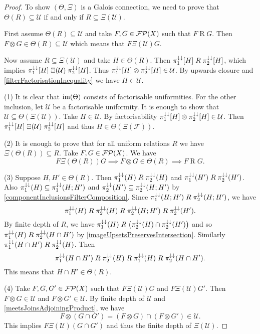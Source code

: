 \begin{proof}
To show $(\Theta,\Xi)$ is a Galois connection, we need to prove that $\Theta(R) \subseteq \mathcal{U}$ \textup{if and only if} $R \subseteq \Xi(\mathcal{U})$.

First assume $\Theta(R) \subseteq \mathcal{U}$ and take $F,G\in\operatorname{\mathcal{FP}}(X)$ such that $F\mathrel{R} G$. Then $F\otimes G\in \Theta(R)\subseteq\mathcal{U}$ which means that $F\mathrel{\Xi(\mathcal{U})}G$.

Now assume $R \subseteq \Xi(\mathcal{U})$ and take $H\in \Theta(R)$. Then $\pi_1^{\downarrow\downarrow}[H]\mathrel{R}\pi_2^{\downarrow\downarrow}[H]$, which implies $\pi_1^{\downarrow\downarrow}[H]\mathrel{\Xi(\mathcal{U})}\pi_2^{\downarrow\downarrow}[H]$. Thus $\pi_1^{\downarrow\downarrow}[H]\otimes \pi_2^{\downarrow\downarrow}[H]\in \mathcal{U}$. By upwards closure and \ref{filterFactorisationInequality} we have $H\in \mathcal{U}$.

(1) It is clear that $\operatorname{im}(\Theta)$ consists of factorisable uniformities. For the other inclusion, let $\mathcal{U}$ be a factorisable uniformity. It is enough to show that $\mathcal{U} \subseteq \Theta(\Xi(\mathcal{U}))$. Take $H\in \mathcal{U}$. By factorisability $\pi_1^{\downarrow\downarrow}[H]\otimes \pi_2^{\downarrow\downarrow}[H]\in \mathcal{U}$. Then $\pi_1^{\downarrow\downarrow}[H]\mathrel{\Xi(\mathcal{U})} \pi_2^{\downarrow\downarrow}[H]$ and thus $H\in \Theta(\Xi(\mathcal{F}))$.

(2) It is enough to prove that for all uniform relations $R$ we have $\Xi(\Theta(R)) \subseteq R$. Take $F,G\in\operatorname{\mathcal{FP}}(X)$. We have
\[ F\mathrel{\Xi(\Theta(R))} G \implies F\otimes G \in\Theta(R) \implies F\mathrel{R}G. \]

(3) Suppose $H, H'\in \Theta(R)$. Then $\pi_1^{\downarrow\downarrow}(H)\mathrel{R}\pi_2^{\downarrow\downarrow}(H)$ and $\pi_1^{\downarrow\downarrow}(H')\mathrel{R}\pi_2^{\downarrow\downarrow}(H')$. Also $\pi_1^{\downarrow\downarrow}(H) \subseteq \pi_1^{\downarrow\downarrow}(H;H')$ and $\pi_2^{\downarrow\downarrow}(H') \subseteq \pi_2^{\downarrow\downarrow}(H;H')$ by \ref{componentInclusionsFilterComposition}. Since $\pi_1^{\downarrow\downarrow}(H;H')\mathrel{R}\pi_2^{\downarrow\downarrow}(H;H')$, we have
\[ \pi_1^{\downarrow\downarrow}(H)\mathrel{R}\pi_2^{\downarrow\downarrow}(H) \mathrel{R}\pi_2^{\downarrow\downarrow}(H;H') \mathrel{R} \pi_2^{\downarrow\downarrow}(H'). \]
By finite depth of $R$, we have $\pi_1^{\downarrow\downarrow}(H)\mathrel{R}\big(\pi_2^{\downarrow\downarrow}(H) \cap \pi_2^{\downarrow\downarrow}(H')\big)$ and so $\pi_1^{\downarrow\downarrow}(H)\mathrel{R} \pi_2^{\downarrow\downarrow}(H\cap H')$ by \ref{imageUpsetsPreservesIntersection}.
Similarly $\pi_1^{\downarrow\downarrow}(H\cap H') \mathrel{R} \pi_2^{\downarrow\downarrow}(H)$. Then
\[ \pi_1^{\downarrow\downarrow}(H\cap H') \mathrel{R} \pi_2^{\downarrow\downarrow}(H) \mathrel{R} \pi_1^{\downarrow\downarrow}(H)\mathrel{R} \pi_2^{\downarrow\downarrow}(H\cap H'). \]
This means that $H\cap H' \in \Theta(R)$.

(4) Take $F,G,G'\in \operatorname{\mathcal{FP}}(X)$ such that $F\mathrel{\Xi(\mathcal{U})}G$ and $F\mathrel{\Xi(\mathcal{U})}G'$. Then $F\otimes G \in \mathcal{U}$ and $F\otimes G'\in \mathcal{U}$. By finite depth of $\mathcal{U}$ and \ref{meetsJoinsAdjoiningProduct}, we have
\[ F\otimes (G\cap G') = (F\otimes G) \cap (F\otimes G') \in \mathcal{U}. \]
This implies $F\mathrel{\Xi(\mathcal{U})}(G\cap G')$ and thus the finite depth of $\Xi(\mathcal{U})$.
\end{proof}


